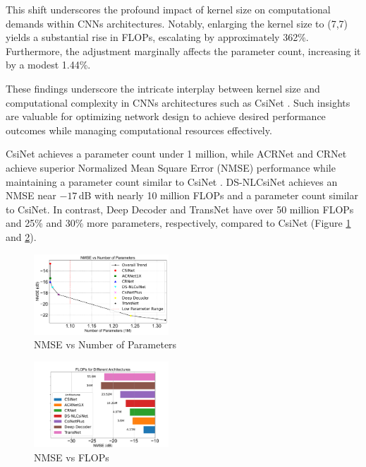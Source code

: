 \documentclass[lettersize,journal]{IEEEtran}
\begin{document}
This shift underscores the profound impact of kernel size on computational demands within CNNs architectures. Notably, enlarging the kernel size to (7,7) yields a substantial rise in FLOPs, escalating by approximately 362\%. Furthermore, the adjustment marginally affects the parameter count, increasing it by a modest 1.44\%.

These findings underscore the intricate interplay between kernel size and computational complexity in CNNs architectures such as CsiNet \cite{abe}. Such insights are valuable for optimizing network design to achieve desired performance outcomes while managing computational resources effectively.

CsiNet \cite{abe} achieves a parameter count under 1 million, while ACRNet \cite{abx} and CRNet \cite{abn} achieve superior Normalized Mean Square Error (NMSE) performance while maintaining a parameter count similar to CsiNet \cite{abe}. DS-NLCsiNet \cite{abq} achieves an NMSE near $-17$\,dB with nearly 10 million FLOPs and a parameter count similar to CsiNet. In contrast, Deep Decoder \cite{aby} and TransNet \cite{abz} have over 50 million FLOPs and 25\% and 30\% more parameters, respectively, compared to CsiNet (Figure \ref{fig:nmse-params} and \ref{fig:nmse-flops}).

\begin{figure}[!t]
  \centering
  \includegraphics[width=0.45\textwidth]{NMSEvsNofparametters.pdf}
  \caption{NMSE vs Number of Parameters}
  \label{fig:nmse-params}
\end{figure}

\begin{figure}[!t]
  \centering
  \includegraphics[width=0.45\textwidth]{NMSEvsFLOPs.pdf}
  \caption{NMSE vs FLOPs}
  \label{fig:nmse-flops}
\end{figure}
\end{document}
